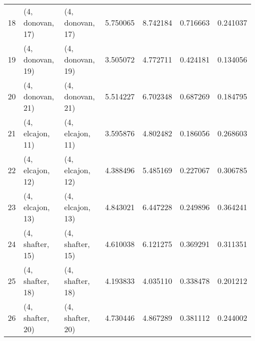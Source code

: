 \begin{tabular}{lllrrrr}
18 &  (4, donovan, 17) &  (4, donovan, 17) &  5.750065 &  8.742184 &   0.716663 &  0.241037 \\
19 &  (4, donovan, 19) &  (4, donovan, 19) &  3.505072 &  4.772711 &   0.424181 &  0.134056 \\
20 &  (4, donovan, 21) &  (4, donovan, 21) &  5.514227 &  6.702348 &   0.687269 &  0.184795 \\
21 &  (4, elcajon, 11) &  (4, elcajon, 11) &  3.595876 &  4.802482 &   0.186056 &  0.268603 \\
22 &  (4, elcajon, 12) &  (4, elcajon, 12) &  4.388496 &  5.485169 &   0.227067 &  0.306785 \\
23 &  (4, elcajon, 13) &  (4, elcajon, 13) &  4.843021 &  6.447228 &   0.249896 &  0.364241 \\
24 &  (4, shafter, 15) &  (4, shafter, 15) &  4.610038 &  6.121275 &   0.369291 &  0.311351 \\
25 &  (4, shafter, 18) &  (4, shafter, 18) &  4.193833 &  4.035110 &   0.338478 &  0.201212 \\
26 &  (4, shafter, 20) &  (4, shafter, 20) &  4.730446 &  4.867289 &   0.381112 &  0.244002 \\
\bottomrule
\end{tabular}
